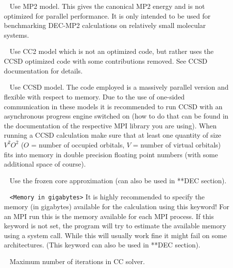 \begin{description}

\item[]\verb| | \newline
Use MP2 model. This gives the canonical MP2 energy and is not optimized for parallel performance. It is only intended to be used for benchmarking DEC-MP2 calculations on relatively small molecular systems.

\item[]\verb| | \newline
Use CC2 model which is not an optimized code, but rather uses the CCSD optimized code with some contributions removed. See CCSD documentation for details.

\item[]\verb| | \newline
Use CCSD model. The code employed is a massively parallel version and flexible with respect to memory. Due to the use of one-sided communication in these models it is recommended to run CCSD with an asynchronous progress engine switched on (how to do that can be found in the documentation of the respective MPI library you are using). When running a CCSD calculation make sure that at least one quantity of size $V^2O^2$ ($O$ = number of occupied orbitals, $V$ = number of virtual orbitals) fits into memory in double precision floating point numbers (with some additional space of course). 

\item[]  \verb| | \newline
Use the frozen core approximation (can also be used in **DEC section).

\item[] \verb| | \newline
\verb|<Memory in gigabytes>| \newline
It is highly recommended to specify the memory (in gigabytes) available for the calculation using this keyword! For an MPI run this is the memory available for each MPI process.
If this keyword is not set, the program will try to estimate the available memory using a system call. While this will usually work fine it might fail on some architectures.
(This keyword can also be used in **DEC section).

\item[]  \verb| | \newline
Maximum number of iterations in CC solver.


\end{description}
